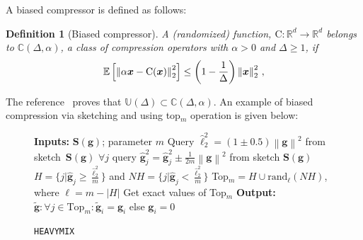 \documentclass{article} %
\newtheorem{lemma}{Lemma}
\newtheorem{definition}{Definition}
\begin{document}
A biased compressor is defined as follows:
\begin{definition}[Biased compressor]
A (randomized) function,  ${\text{C}}:\mathbb{R}^{d}\rightarrow\mathbb{R}^{d}$ belongs to $\mathbb{C}(\Delta,\alpha)$, a class of compression operators with $\alpha>0$ and $\Delta\geq 1$, if
\begin{align}\notag
    \mathbb{E}\left[\left\|\alpha\boldsymbol{x}-{\text{C}}(\boldsymbol{x})\right\|^2_2\right]\leq \left(1-\frac{1}{\Delta}\right)\left\|\boldsymbol{x}\right\|^2_2\, ,
\end{align}
\end{definition}
The reference~\citep{horvath2020better} proves that $\mathbb{U}(\Delta)\subset\mathbb{C}(\Delta, \alpha)$.
An example of biased compression via sketching and using top$_m$ operation is given below:
\begin{figure}\vspace{-0.4cm}
\begin{minipage}{\linewidth}
\begin{algorithm}[H]
\caption{\texttt{HEAVYMIX}  }\label{alg:heavymix}
\begin{algorithmic}[1]
\STATE \textbf{Inputs:} $\mathbf{S}({\mathbf{g}})$; parameter $m$
\STATE Query $\hat{\ell}_2^2=\left(1\pm 0.5\right)\left\|\mathbf{g}\right\|^2$ from sketch~$\mathbf{S}(\mathbf{g})$
\STATE $\forall j$ query $\hat{\mathbf{g}}_j^2=\hat{\mathbf{g}}_j^2\pm \frac{1}{2m}\left\|\mathbf{g}\right\|^2$ from sketch $\mathbf{S}(\mathbf{g})$
\STATE $H=\{j|\hat{\mathbf{g}}_j\geq \frac{\hat{\ell}_2^2}{m}\}$ and $NH=\{j|\hat{\mathbf{g}}_j<\frac{\hat{\ell}_2^2}{m}\}$
\STATE Top$_m=H\cup \text{rand}_\ell(NH)$, where $\ell=m-\left|H\right|$
\STATE Get exact values of Top$_m$ 
\STATE \textbf{Output:} $\tilde{\mathbf{g}}:\forall j\in\text{Top}_m:\tilde{\mathbf{g}}_{i}=\mathbf{g}_{i}$ else $ \mathbf{g}_{i}=0$
\end{algorithmic}
\end{algorithm}
\vspace{-0.1in}
\end{minipage}\end{figure}
\end{document}
